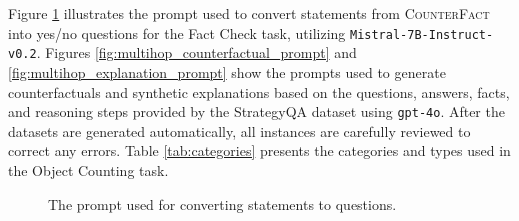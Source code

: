 

Figure \ref{fig:question_prompt} illustrates the prompt used to convert statements from \textsc{CounterFact} into yes/no questions for the Fact Check task, utilizing \texttt{Mistral-7B-Instruct-v0.2}. Figures \ref{fig:multihop_counterfactual_prompt} and \ref{fig:multihop_explanation_prompt} show the prompts used to generate counterfactuals and synthetic explanations based on the questions, answers, facts, and reasoning steps provided by the StrategyQA dataset using \texttt{gpt-4o}. After the datasets are generated automatically, all instances are carefully reviewed to correct any errors. Table \ref{tab:categories} presents the categories and types used in the Object Counting task.

\begin{figure}[h]

\caption{The prompt used for converting statements to questions.}
\label{fig:question_prompt}
\end{figure}


\begin{figure*}[h]

\caption{The prompt used for generating counterfactuals for multi-hop reasoning task.}
\label{fig:multihop_counterfactual_prompt}
\end{figure*}

\begin{figure*}[h]

\caption{The prompt used for generating synthetic explanations for multi-hop reasoning task.}
\label{fig:multihop_explanation_prompt}
\end{figure*}
